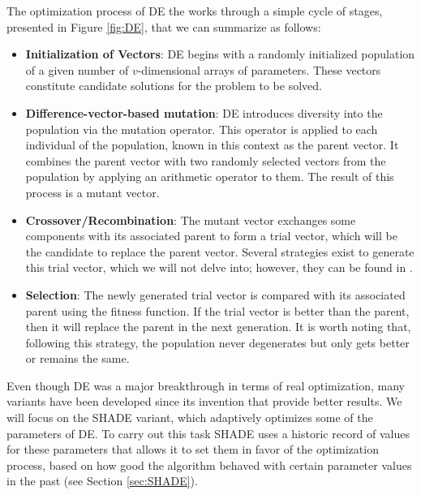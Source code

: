 The optimization process of \acs{DE} the works through a simple cycle of stages, presented in Figure \ref{fig:DE}, that we can summarize as follows:

\begin{itemize}
	
	\item \textbf{Initialization of Vectors}: \acs{DE} begins with a randomly initialized population of a given number of $v$-dimensional arrays of parameters. These vectors constitute candidate solutions for the problem to be solved.
	
	\item \textbf{Difference-vector-based mutation}: \acs{DE} introduces diversity into the population via the mutation operator. This operator is applied to each individual of the population, known in this context as the parent vector. It combines the parent vector with two randomly selected vectors from the population by applying an arithmetic operator to them. The result of this process is a mutant vector.
	
	\item \textbf{Crossover/Recombination}: The mutant vector exchanges some components with its associated parent to form a trial vector, which will be the candidate to replace the parent vector. Several strategies exist to generate this trial vector, which we will not delve into; however, they can be found in \cite{das2011differential}.
	
	\item \textbf{Selection}: The newly generated trial vector is compared with its associated parent using the fitness function. If the trial vector is better than the parent, then it will replace the parent in the next generation. It is worth noting that, following this strategy, the population never degenerates but only gets better or remains the same.
	
\end{itemize}

Even though \acs{DE} was a major breakthrough in terms of real optimization, many variants have been developed since its invention that provide better results. We will focus on the SHADE variant, which adaptively optimizes some of the parameters of \acs{DE}. To carry out this task SHADE uses a historic record of values for these parameters that allows it to set them in favor of the optimization process, based on how good the algorithm behaved with certain parameter values in the past (see Section \ref{sec:SHADE}).

